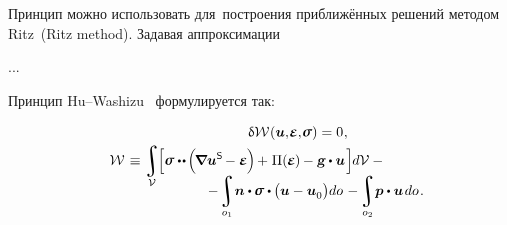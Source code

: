 \begin{otherlanguage}{russian}

Принцип можно использовать для~построения приближённых решений методом Ritz~(Ritz method).
Задавая аппроксимации

...

Принцип Hu\hbox{--}Washizu~\cite{washizubook} формулируется так:

\nopagebreak\vspace{-0.2em}\begin{multline}\label{huwashizuvariationalprinciple}
\hfil \variation{\mathcal{W}} \hspace{.1ex} (\bm{u}, \hspace{-0.32ex}\infinitesimaldeformation, \hspace{-0.32ex}\linearstress) = 0
\hspace{.1ex} ,
\\[-0.1em]
%
\shoveleft{\displaystyle \mathcal{W} \hspace{.2ex} \equiv
\displaystyle\integral\displaylimits_{\mathcal{V}} \hspace{-0.3ex}
\Bigl[
\linearstress \dotdotp \hspace{-0.2ex} \Bigl( \hspace{-0.2ex} \boldnabla {\bm{u}}^{\mathsf{S}} \hspace{-0.2ex} - \infinitesimaldeformation \hspace{-0.1ex} \Bigr) \hspace{-0.2ex} + \hspace{.1ex} \potentialenergydensity (\hspace{-0.1ex}\infinitesimaldeformation\hspace{-0.1ex})\hspace{-0.1ex} -
\volumeloadvector \hspace{-0.1ex} \dotp \bm{u}
\hspace{.2ex} \Bigr] \hspace{-0.1ex} d\mathcal{V} \hspace{.5ex}
- \hfill}
\\[-1.2em]
%
\hspace{8em}
- \hspace{-0.2ex} \displaystyle\integral\displaylimits_{o_1} \hspace{-0.4ex} \unitnormalvector \dotp \hspace{-0.1ex} \linearstress \dotp \hspace{-0.1ex} \bigl( \bm{u} - \bm{u}_{\raisemath{-0.1em}{0}} \bigr) do \hspace{.2ex}
- \hspace{-0.2ex} \integral\displaylimits_{o_2} \hspace{-0.4ex} \bm{p} \dotp \bm{u} \hspace{.25ex} do
\hspace{.2ex} .
\end{multline}


\end{otherlanguage}
